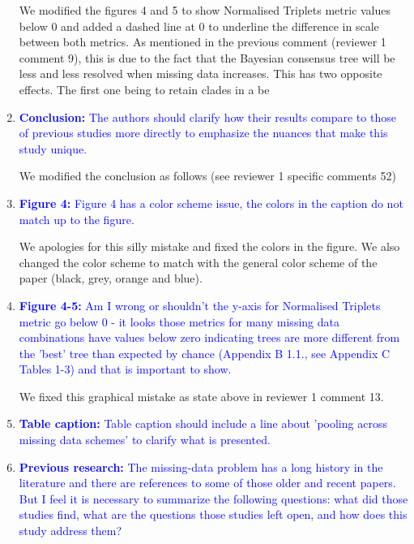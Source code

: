 \documentclass[12pt,letterpaper]{article}
\begin{document}
\begin{enumerate}
We modified the figures 4 and 5 to show Normalised Triplets metric values below 0 and added a dashed line at 0 to underline the difference in scale between both metrics.
As mentioned in the previous comment (reviewer 1 comment 9), this is due to the fact that the Bayesian consensus tree will be less and less resolved when missing data increases. This has two opposite effects. The first one being to retain clades in a be 


\item{\textcolor{blue}{\textbf{Conclusion:} The authors should clarify how their results compare to those of previous studies more directly to emphasize the nuances that make this study unique. }}

We modified the conclusion as follows (see reviewer 1 specific comments 52)

\item{\textcolor{blue}{\textbf{Figure 4:} Figure 4 has a color scheme issue, the colors in the caption do not match up to the figure.}}

We apologies for this silly mistake and fixed the colors in the figure. We also changed the color scheme to match with the general color scheme of the paper (black, grey, orange and blue).

\item{\textcolor{blue}{\textbf{Figure 4-5:} Am I wrong or shouldn't the y-axis for Normalised Triplets metric go below 0 - it looks those metrics for many missing data combinations have values below zero indicating trees are more different from the 'best' tree than expected by chance (Appendix B 1.1., see Appendix C Tables 1-3) and that is important to show.}}

We fixed this graphical mistake as state above in reviewer 1 comment 13.

\item{\textcolor{blue}{\textbf{Table caption:} Table caption should include a line about 'pooling across missing data schemes' to clarify what is presented.}}

\item{\textcolor{blue}{\textbf{Previous research:} The missing-data problem has a long history in the literature and there are references to some of those older and recent papers.
But I feel it is necessary to summarize the following questions: what did those studies find, what are the questions those studies left open, and how does this study address them?}}

\end{enumerate}
\end{document}
